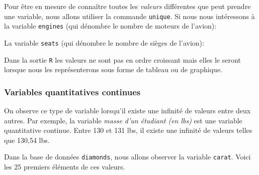 \documentclass[]{book}
\newenvironment{Shaded}{\begin{snugshade}}{\end{snugshade}}
\newcommand{\DecValTok}[1]{\textcolor[rgb]{0.00,0.00,0.81}{#1}}
\newcommand{\KeywordTok}[1]{\textcolor[rgb]{0.13,0.29,0.53}{\textbf{#1}}}
\newcommand{\NormalTok}[1]{#1}
\newcommand{\OperatorTok}[1]{\textcolor[rgb]{0.81,0.36,0.00}{\textbf{#1}}}
\theoremstyle{definition}
\theoremstyle{definition}
\theoremstyle{definition}
\theoremstyle{remark}
\begin{document}
Pour être en mesure de connaître toutes les \emph{valeurs} différentes
que peut prendre une variable, nous allons utiliser la commande
\texttt{unique}. Si nous nous intéressons à la variable \texttt{engines}
(qui dénombre le nombre de moteurs de l'avion):

\begin{Shaded}
\end{Shaded}

La variable \texttt{seats} (qui dénombre le nombre de sièges de
l'avion):

\begin{Shaded}
\end{Shaded}

Dans la sortie \texttt{R} les valeurs ne sont pas en ordre croissant
mais elles le seront lorsque nous les représenterons sous forme de
tableau ou de graphique.

\hypertarget{variables-quantitatives-continues}{%
\subsubsection{Variables quantitatives
continues}\label{variables-quantitatives-continues}}

On observe ce type de variable lorsqu'il existe une infinité de valeurs
entre deux autres. Par exemple, la variable \emph{masse d'un étudiant
(en lbs)} est une variable quantitative continue. Entre 130 et 131 lbs,
il existe une infinité de valeurs telles que 130,54 lbs.

Dans la base de données \texttt{diamonds}, nous allons observer la
variable \texttt{carat}. Voici les 25 premiers éléments de ces valeurs.

\begin{Shaded}
\end{Shaded}
\end{document}

